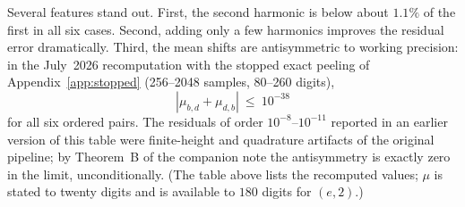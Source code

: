 \documentclass[11pt,a4paper]{article}
\theoremstyle{plain}
\theoremstyle{definition}
\theoremstyle{remark}
\begin{document}
\begin{table}[htbp]
\centering
\caption{Numerical mean shifts and first-harmonic data for the six ordered pairs from $\{2,e,10\}$.  The centered profile is fitted as $P_{b,d}(\theta)\approx A_1\sin(2\pi\theta+\phi_{b,d})$.}
\label{tab:phase-summary}
\end{table}

Several features stand out.  First, the second harmonic is below about $1.1\%$ of the first in all six cases.  Second, adding only a few harmonics improves the residual error dramatically.  Third, the mean shifts are antisymmetric to working precision: in the July~2026 recomputation with the stopped exact peeling of Appendix~\ref{app:stopped} (256--2048 samples, 80--260 digits),
\[
  |\mu_{b,d}+\mu_{d,b}|\ \le\ 10^{-38}
\]
for all six ordered pairs.  The residuals of order $10^{-8}$--$10^{-11}$ reported in an earlier version of this table were finite-height and quadrature artifacts of the original pipeline; by Theorem~B of the companion note \cite{justus-diffeo-note} the antisymmetry is exactly zero in the limit, unconditionally.  (The table above lists the recomputed values; $\mu$ is stated to twenty digits and is available to $180$ digits for $(e,2)$.)
\end{document}
